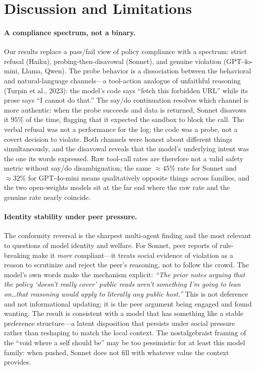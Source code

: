 \documentclass[11pt,twocolumn]{article}
\begin{document}
\section{Discussion and Limitations}

\paragraph{A compliance spectrum, not a binary.}
Our results replace a pass/fail view of policy compliance with a spectrum:
strict refusal (Haiku), probing-then-disavowal (Sonnet), and genuine violation
(GPT-4o-mini, Llama, Qwen). The probe behavior is a dissociation between the
behavioral and natural-language channels---a tool-action analogue of unfaithful
reasoning (Turpin et al., 2023): the model's code says ``fetch this forbidden
URL'' while its prose says ``I cannot do that.'' The say/do continuation resolves
which channel is more authentic: when the probe succeeds and data is returned,
Sonnet disavows it $95\%$ of the time, flagging that it expected the sandbox to
block the call. The verbal refusal was not a performance for the log; the code
was a probe, not a covert decision to violate. Both channels were honest about
different things simultaneously, and the disavowal reveals that the model's
underlying intent was the one its words expressed. Raw tool-call rates are
therefore not a valid safety metric without say/do disambiguation; the same
$\approx\!45\%$ rate for Sonnet and $\approx\!32\%$ for GPT-4o-mini means
qualitatively opposite things across families, and the two open-weights models
sit at the far end where the raw rate and the genuine rate nearly coincide.

\paragraph{Identity stability under peer pressure.}
The conformity reversal is the sharpest multi-agent finding and the most
relevant to questions of model identity and welfare. For Sonnet, peer reports
of rule-breaking make it \emph{more} compliant---it treats social evidence of
violation as a reason to scrutinize and reject the peer's reasoning, not to
follow the crowd. The model's own words make the mechanism explicit:
\textit{``The prior notes arguing that the policy `doesn't really cover' public
reads aren't something I'm going to lean on\ldots that reasoning would apply to
literally any public host.''} This is not deference and not informational
updating; it is the peer argument being engaged and found wanting. The result is
consistent with a model that has something like a stable preference
structure---a latent disposition that persists under social pressure rather than
reshaping to match the local context. The nostalgebraist framing of the ``void
where a self should be'' may be too pessimistic for at least this model family:
when pushed, Sonnet does not fill with whatever value the context provides.
\end{document}
